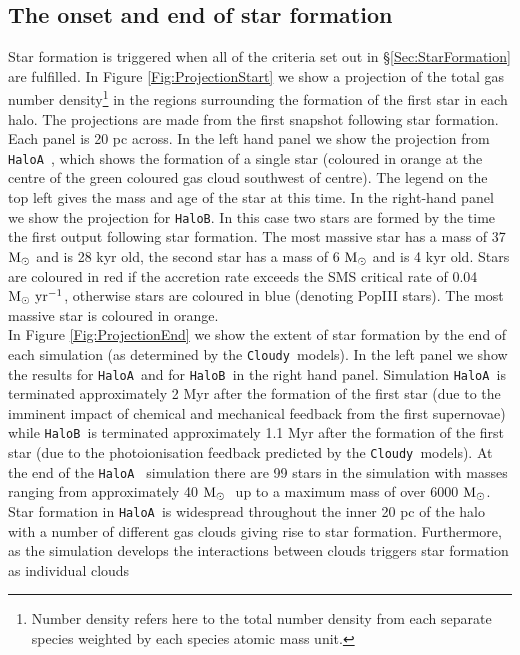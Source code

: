\documentclass[graphics, twocolumn, usenatbib]{mn2e}
\newcommand{\cloudy}{\texttt{Cloudy~}}
\newcommand{\msolar} {$\rm{M_{\odot}}~$}
\newcommand{\msolarc} {$\rm{M_{\odot}}$}
\newcommand{\msolaryrc} {$\rm{M_{\odot}~yr^{-1}}$}
\newcommand{\ha} {\texttt{HaloA~}}
\newcommand{\hb} {\texttt{HaloB~}}
\newcommand{\hbc} {\texttt{HaloB}}
\begin{document}



\subsection{The onset and end of star formation}
Star formation is triggered when all of the criteria set out in \S \ref{Sec:StarFormation} are
fulfilled. In Figure \ref{Fig:ProjectionStart} we show a projection of the total gas number
density\footnote{Number density refers here to the total number density from each separate
  species weighted by each species atomic mass unit.} in the
regions surrounding the formation of the first star in each halo. The projections are made from the
first snapshot following star formation. Each panel is 20 pc across. In the left hand panel we
show the projection from \ha, which shows the formation of a single star (coloured in orange
at the centre of the green coloured gas cloud southwest of centre). The legend on the top left gives the mass and
age of the star at this time.
In the right-hand panel we show the projection for \hbc. In this case two stars are formed by the time the first
output following star formation. The most massive star has a mass of 37 \msolar and is 28 kyr old,
the second star has a mass of 6 \msolar and is 4 kyr old. Stars are coloured in red if the
accretion rate exceeds the SMS critical rate of 0.04 \msolaryrc, otherwise 
stars are coloured in blue (denoting PopIII stars). The most massive star is
coloured in orange. \\
\indent In Figure \ref{Fig:ProjectionEnd} we show the extent of star formation by the end of each
simulation (as determined by the \cloudy models). In the left panel we show the results for \ha and
for \hb in the right hand panel. Simulation \ha is terminated approximately 2 Myr 
after the formation of the first
star (due to the imminent impact of chemical and mechanical feedback from the first supernovae) while \hb is terminated approximately
1.1 Myr after the formation of the first star (due to the photoionisation feedback predicted by the \cloudy models). At the end of the \ha
simulation there are 99 stars in the simulation with masses ranging from approximately 40 \msolar
up to a maximum mass of over 6000 \msolarc.  Star formation in \ha is widespread throughout the
inner 20 pc of the halo with a number of different gas clouds giving rise to star formation. Furthermore, as the simulation develops the interactions between clouds triggers star formation as individual clouds
\end{document}
